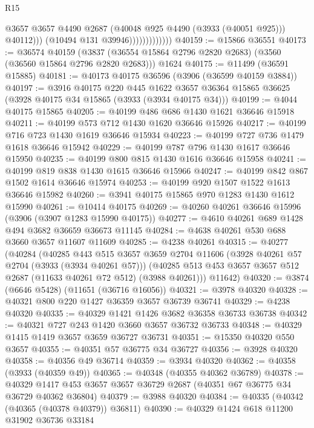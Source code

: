 \begin{lexlean}{R15}
\begin{coremodule}
                                  @3657
                                  @3657
                                  @4490
                                  @2687
                                  (@40048 @925 @4490 (@3933 (@40051 @925)))
                                  @40112)))
                            (@10494 @131 @39946)))))))))))))
@40159 := @15866 @36551
@40173 := @36574
    @40159
    (@3837 (@36554 @15864 @2796 @2820 @2683) (@3560 (@36560 @15864 @2796 @2820 @2683)))
    @1624
@40175 := @11499 (@36591 @15885)
@40181 := @40173 @40175 @36596 (@3906 (@36599 @40159 @3884))
@40197 := @3916
    @40175
    @220
    @445
    @1622
    @3657
    @36364
    @15865
    @36625
    (@3928 @40175 @34 @15865 (@3933 (@3934 @40175 @34)))
@40199 := @4044 @40175 @15865
@40205 := @40199 @486 @686 @1430 @1621 @36646 @15918
@40211 := @40199 @573 @712 @1430 @1620 @36646 @15926
@40217 := @40199 @716 @723 @1430 @1619 @36646 @15934
@40223 := @40199 @727 @736 @1479 @1618 @36646 @15942
@40229 := @40199 @787 @796 @1430 @1617 @36646 @15950
@40235 := @40199 @800 @815 @1430 @1616 @36646 @15958
@40241 := @40199 @819 @838 @1430 @1615 @36646 @15966
@40247 := @40199 @842 @867 @1502 @1614 @36646 @15974
@40253 := @40199 @920 @1507 @1522 @1613 @36646 @15982
@40260 := @3941 @40175 @15865 @970 @1283 @1430 @1612 @15990
@40261 := @10414 @40175
@40269 := @40260 @40261 @36646 @15996 (@3906 (@3907 @1283 @15990 @40175))
@40277 := @4610 @40261 @689 @1428 @494 @3682 @36659 @36673 @11145
@40284 := @4638 @40261 @530 @688 @3660 @3657 @11607 @11609
@40285 := @4238 @40261
@40315 := @40277
    (@40284
      (@40285
        @443
        @515
        @3657
        @3659
        @2704
        @11606
        (@3928 @40261 @57 @2704 (@3933 (@3934 @40261 @57)))
        (@40285 @513 @453 @3657 @3657 @512 @2687 (@11633 @40261 @72 @512) (@3988 @40261)))
      @11642)
@40320 := @3874 (@6646 @5428) (@11651 (@36716 @16056))
@40321 := @3978 @40320
@40328 := @40321 @800 @220 @1427 @36359 @3657 @36739 @36741
@40329 := @4238 @40320
@40335 := @40329 @1421 @1426 @3682 @36358 @36733 @36738
@40342 := @40321 @727 @243 @1420 @3660 @3657 @36732 @36733
@40348 := @40329 @1415 @1419 @3657 @3659 @36727 @36731
@40351 := @15350 @40320 @550 @3657
@40355 := @40351 @57 @36775 @34 @36727
@40356 := @3928 @40320
@40358 := @40356 @49 @36714
@40359 := @3934 @40320
@40362 := @40358 (@3933 (@40359 @49))
@40365 := @40348 (@40355 @40362 @36789)
@40378 := @40329 @1417 @453 @3657 @3657 @36729 @2687 (@40351 @67 @36775 @34 @36729 @40362 @36804)
@40379 := @3988 @40320
@40384 := @40335 (@40342 (@40365 (@40378 @40379)) @36811)
@40390 := @40329 @1424 @618 @11200 @31902 @36736 @33184

\end{coremodule}
\end{lexlean}
